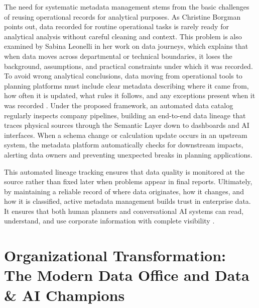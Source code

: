 The need for systematic metadata management stems from the basic challenges of reusing operational records for analytical purposes. 
As Christine Borgman \cite{borgman2015big} points out, data recorded for routine operational tasks is rarely ready for analytical analysis without careful cleaning and context. 
This problem is also examined by Sabina Leonelli \cite{Leonelli2016data} in her work on data journeys, which explains that when data moves across departmental or technical boundaries, 
it loses the background, assumptions, and practical constraints under which it was recorded. 
To avoid wrong analytical conclusions, data moving from operational tools to planning platforms must include clear metadata describing where it came from, 
how often it is updated, what rules it follows, and any exceptions present when it was recorded \cite{borgman2015big, Leonelli2016data}.
Under the proposed framework, an automated data catalog regularly inspects company pipelines, building an end-to-end data lineage that traces physical sources through 
the Semantic Layer down to dashboards and AI interfaces. When a schema change or calculation update occurs in an upstream system, the metadata platform automatically 
checks for downstream impacts, alerting data owners and preventing unexpected breaks in planning applications.

This automated lineage tracking ensures that data quality is monitored at the source rather than fixed later when problems appear in final reports. 
Ultimately, by maintaining a reliable record of where data originates, how it changes, and how it is classified, active metadata management builds trust in enterprise data. 
It ensures that both human planners and conversational AI systems can read, understand, and use corporate information with complete visibility \cite{borgman2015big, dama2024dmbok}.


\section[Organizational Transformation]{Organizational Transformation: The Modern Data Office and Data \& AI Champions}
\label{sec:organizational_transformation}


